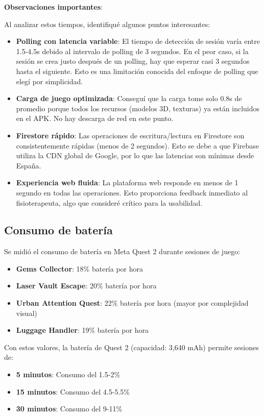 \textbf{Observaciones importantes}:

Al analizar estos tiempos, identifiqué algunos puntos interesantes:

\begin{itemize}
    \item \textbf{Polling con latencia variable}: El tiempo de detección de sesión varía entre 1.5-4.5s debido al intervalo de polling de 3 segundos. En el peor caso, si la sesión se crea justo después de un polling, hay que esperar casi 3 segundos hasta el siguiente. Esto es una limitación conocida del enfoque de polling que elegí por simplicidad.
    
    \item \textbf{Carga de juego optimizada}: Conseguí que la carga tome solo 0.8s de promedio porque todos los recursos (modelos 3D, texturas) ya están incluidos en el APK. No hay descarga de red en este punto.
    
    \item \textbf{Firestore rápido}: Las operaciones de escritura/lectura en Firestore son consistentemente rápidas (menos de 2 segundos). Esto se debe a que Firebase utiliza la CDN global de Google, por lo que las latencias son mínimas desde España.
    
    \item \textbf{Experiencia web fluida}: La plataforma web responde en menos de 1 segundo en todas las operaciones. Esto proporciona feedback inmediato al fisioterapeuta, algo que consideré crítico para la usabilidad.
\end{itemize}

\subsection{Consumo de batería}

Se midió el consumo de batería en Meta Quest 2 durante sesiones de juego:

\begin{itemize}
    \item \textbf{Gems Collector}: 18\% batería por hora
    \item \textbf{Laser Vault Escape}: 20\% batería por hora
    \item \textbf{Urban Attention Quest}: 22\% batería por hora (mayor por complejidad visual)
    \item \textbf{Luggage Handler}: 19\% batería por hora
\end{itemize}

Con estos valores, la batería de Quest 2 (capacidad: 3,640 mAh) permite sesiones de:
\begin{itemize}
    \item \textbf{5 minutos}: Consumo del 1.5-2\%
    \item \textbf{15 minutos}: Consumo del 4.5-5.5\%
    \item \textbf{30 minutos}: Consumo del 9-11\%
\end{itemize}

